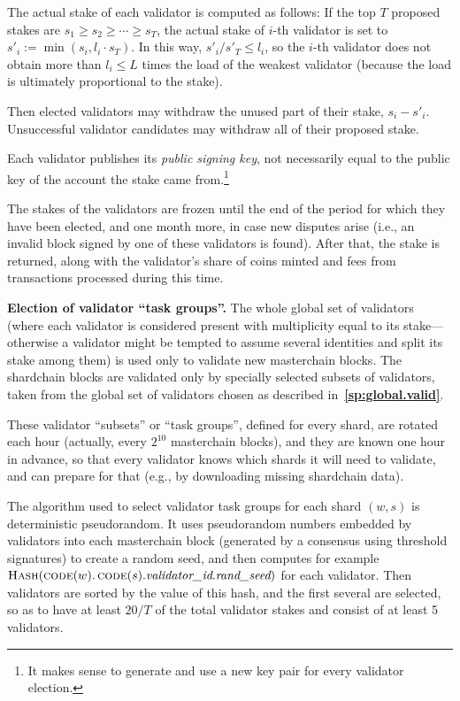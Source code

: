 \documentclass[12pt,oneside]{article}
\def\makepoint#1{\medbreak\noindent{\bf #1.\ }}
\def\nxsubpoint{\refstepcounter{subsubsection}%
  \smallbreak\makepoint{\thesubsubsection}}
\def\refpoint#1{{\rm\textbf{\ref{#1}}}}
\let\ptref=\refpoint
\def\embt(#1.){\textbf{#1.}}
\let\vr=\textit
\def\opsc#1{\operatorname{\textsc{#1}}}
\def\Hash{\opsc{Hash}}
\def\code{\opsc{code}}
\begin{document}
The actual stake of each validator is computed as follows: If the top
$T$ proposed stakes are $s_1\geq s_2\geq\cdots\geq s_T$, the actual
stake of $i$-th validator is set to $s'_i:=\min(s_i,l_i\cdot s_T)$. In
this way, $s'_i/s'_T\leq l_i$, so the $i$-th validator does not obtain
more than $l_i\leq L$ times the load of the weakest validator (because
the load is ultimately proportional to the stake).

Then elected validators may withdraw the unused part of their stake,
$s_i-s'_i$. Unsuccessful validator candidates may withdraw all of
their proposed stake.

Each validator publishes its {\em public signing key}, not necessarily
equal to the public key of the account the stake came
from.\footnote{It makes sense to generate and use a new key pair for
  every validator election.}

The stakes of the validators are frozen until the end of the period for
which they have been elected, and one month more, in case new disputes
arise (i.e., an invalid block signed by one of these validators is
found). After that, the stake is returned, along with the validator's
share of coins minted and fees from transactions processed during this
time.

\nxsubpoint\label{sp:val.task.grp} \embt(Election of validator ``task
groups''.)  The whole global set of validators (where each validator
is considered present with multiplicity equal to its stake---otherwise
a validator might be tempted to assume several identities and split
its stake among them) is used only to validate new masterchain
blocks. The shardchain blocks are validated only by specially selected
subsets of validators, taken from the global set of validators chosen
as described in~\ptref{sp:global.valid}.

These validator ``subsets'' or ``task groups'', defined for every
shard, are rotated each hour (actually, every $2^{10}$ masterchain
blocks), and they are known one hour in advance, so that every
validator knows which shards it will need to validate, and can prepare
for that (e.g., by downloading missing shardchain data).

The algorithm used to select validator task groups for each shard
$(w,s)$ is deterministic pseudorandom. It uses pseudorandom numbers
embedded by validators into each masterchain block (generated by a
consensus using threshold signatures) to create a random seed, and
then computes for example
$\Hash(\code(w).\code(s).\vr{validator\_id}.\vr{rand\_seed})$ for each
validator. Then validators are sorted by the value of this hash, and
the first several are selected, so as to have at least $20/T$ of the
total validator stakes and consist of at least 5 validators.
\end{document}
